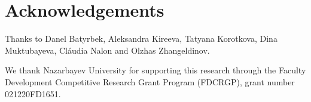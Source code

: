 \documentclass{article}
\begin{document}
\section{Acknowledgements}

Thanks to Danel Batyrbek, Aleksandra Kireeva,
Tatyana Korotkova, Dina Muktubayeva, Cl\'{a}udia Nalon and
Olzhas Zhangeldinov. 

\noindent
We thank Nazarbayev University for
supporting this research through the Faculty Development Competitive
Research Grant Program (FDCRGP), grant number 021220FD1651.



\end{document}
